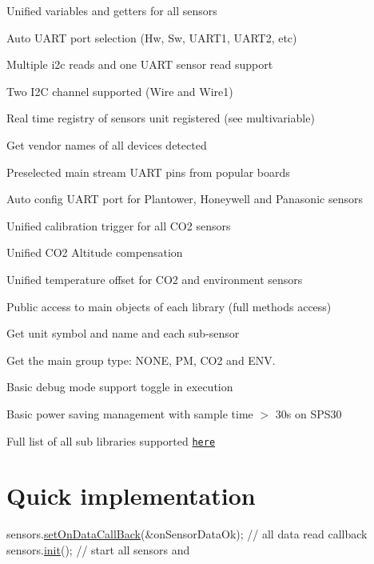 \begin{DoxyItemize}
\item Unified variables and getters for all sensors
\item Auto U\+A\+RT port selection (Hw, Sw, U\+A\+R\+T1, U\+A\+R\+T2, etc)
\item Multiple i2c reads and one U\+A\+RT sensor read support
\item Two I2C channel supported (Wire and Wire1)
\item Real time registry of sensors unit registered (see multivariable)
\item Get vendor names of all devices detected
\item Preselected main stream U\+A\+RT pins from popular boards
\item Auto config U\+A\+RT port for Plantower, Honeywell and Panasonic sensors
\item Unified calibration trigger for all C\+O2 sensors
\item Unified C\+O2 Altitude compensation
\item Unified temperature offset for C\+O2 and environment sensors
\item Public access to main objects of each library (full methods access)
\item Get unit symbol and name and each sub-\/sensor
\item Get the main group type\+: N\+O\+NE, PM, C\+O2 and E\+NV.
\item Basic debug mode support toggle in execution
\item Basic power saving management with sample time $>$ 30s on S\+P\+S30
\end{DoxyItemize}

Full list of all sub libraries supported \href{https://github.com/kike-canaries/canairio_sensorlib/blob/master/library.json#L72-L89}{\tt here}

\section*{Quick implementation}


\begin{DoxyCode}
sensors.\hyperlink{classSensors_a729f911e0508cc8814a2276ff519b219}{setOnDataCallBack}(&onSensorDataOk);   \textcolor{comment}{// all data read callback}
sensors.\hyperlink{classSensors_a019efdf3e65081e9ace94e1f05338e4b}{init}();                               \textcolor{comment}{// start all sensors and}
\end{DoxyCode}


